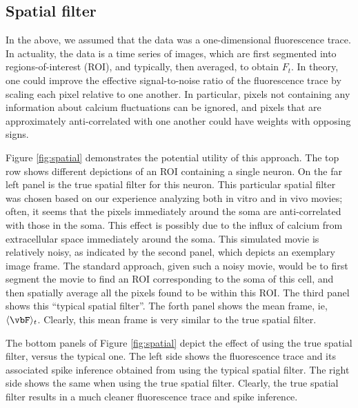 \subsection{Spatial filter}

In the above, we assumed that the data was a one-dimensional fluorescence trace.  In actuality, the data is a time series of images, which are first segmented into regions-of-interest (ROI), and typically, then averaged, to obtain $F_t$.  In theory, one could improve the effective signal-to-noise ratio of the fluorescence trace by scaling each pixel relative to one another.  In particular, pixels not containing any information about calcium fluctuations can be ignored, and pixels that are approximately anti-correlated with one another could have weights with opposing signs.  

Figure \ref{fig:spatial} demonstrates the potential utility of this approach.  The top row shows different depictions of an ROI containing a single neuron.  On the far left panel is the true spatial filter for this neuron.  This particular spatial filter was chosen based on our experience analyzing both in vitro and in vivo movies; often, it seems that the pixels immediately around the soma are anti-correlated with those in the soma.  This effect is possibly due to the influx of calcium from extracellular space immediately around the soma.  This simulated movie is relatively noisy, as indicated by the second panel, which depicts an exemplary image frame.  The standard approach, given such a noisy movie, would be to first segment the movie to find an ROI corresponding to the soma of this cell, and then spatially average all the pixels found to be within this ROI.  The third panel shows this ``typical spatial filter''.  The forth panel shows the mean frame, ie, $\langle \vbF \rangle_t$.  Clearly, this mean frame is very similar to the true spatial filter.

The bottom panels of Figure \ref{fig:spatial} depict the effect of using the true spatial filter, versus the typical one. The left side shows the fluorescence trace and its associated spike inference obtained from using the typical spatial filter.  The right side shows the same when using the true spatial filter.  Clearly, the true spatial filter results in a much cleaner fluorescence trace and spike inference.  


